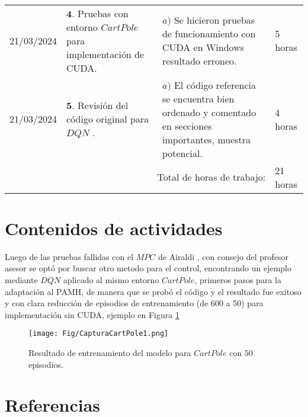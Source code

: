 \documentclass[12pt]{article}
\begin{document}
\hfill\\
\begin{minipage}[h]{\textwidth}
	\centering
	\begin{tabularx}{\textwidth}{|p{2cm}|X|X|p{2cm}|} 
		\hline		
		
	 	21/03/2024 & 
	 	$\mathbf{4}.$ Pruebas con entorno $CartPole$ para implementación de CUDA. &
	 	$a)$ Se hicieron pruebas de funcionamiento con CUDA en Windows resultado erroneo. \newline & 
	 	5 horas \\
	 	21/03/2024 & 
	 	$\mathbf{5}.$ Revisión del código original para $DQN$ \cite{DQNCart}. &
	 	$a)$ El código referencia se encuentra bien ordenado y comentado en secciones importantes, muestra potencial. \newline & 
	 	4 horas \\
	 	
	 	\hline
		\multicolumn{3}{|r|}{Total de horas de trabajo:} & 21 horas \\ 
	 	\hline                 
	\end{tabularx}
\end{minipage}




\section*{Contenidos de actividades}

Luego de las pruebas fallidas con el $MPC$ de Airaldi \cite{Airdaldi2023}, con consejo del profesor asesor se optó por buscar otro metodo para el control, encontrando un ejemplo mediante $DQN$ \cite{DQNCart} aplicado al mismo entorno $CartPole$, primeros pasos para la adaptación al PAMH, de manera que se probó el código y el resultado fue exitoso y con clara reducción de episodios de entrenamiento (de 600 a 50) para implementación sin CUDA, ejemplo en Figura \ref{fig:Cart1} 

\begin{figure}[h]
	\centering
	\texttt{[image: Fig/CapturaCartPole1.png]}
	\caption{Resultado de entrenamiento del modelo para $CartPole$ con $50$ episodios.}
	\label{fig:Cart1}
\end{figure}	

\newpage

\section*{Referencias}
\renewcommand\refname{}


\end{document}
